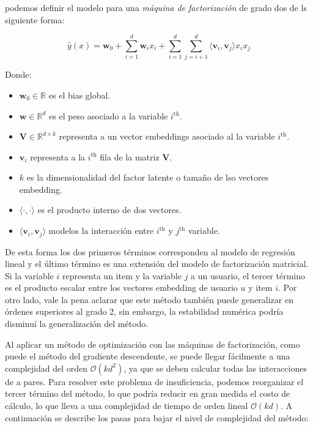 \documentclass[11pt,a4paper,twoside]{thesis}
\begin{document}
podemos definir el modelo para una \textit{máquina de factorización} de grado dos de ls siguiente forma:

\begin{equation*}
\hat{y}(x) = \mathbf{w}_0 + \sum_{i=1}^d \mathbf{w}_i x_i + \sum_{i=1}^d\sum_{j=i+1}^d \langle\mathbf{v}_i, \mathbf{v}_j\rangle x_i x_j
\end{equation*}
\begin{description}
	\item[Donde:]
\end{description}
\begin{itemize}
	\item $\mathbf{w}_0 \in \mathbb{R}$ es el bias global.
	\item $\mathbf{w} \in \mathbb{R}^d$ es el peso asociado a la variable $i^\mathrm{th}$.
	\item $\mathbf{V} \in \mathbb{R}^{d\times k}$ representa a un vector embeddings asociado al la variable $i^\mathrm{th}$.
	\item $\mathbf{v}_i$ representa a la $i^\mathrm{th}$ fila de la matriz $\mathbf{V}$. 
	\item $k$ es la dimensionalidad del factor latente o tamaño de lso vectores embedding.
	\item $\langle\cdot, \cdot \rangle$ es el producto interno de dos vectores.
	\item $\langle \mathbf{v}_i, \mathbf{v}_j \rangle$ modelos la interacción entre $i^\mathrm{th}$ y $j^\mathrm{th}$ variable. 
\end{itemize}

De esta forma los dos primeros términos corresponden al modelo de regresión lineal y el último término es una extensión del modelo de factorización matricial. Si la variable $i$ representa un item y la variable $j$ a un usuario, el tercer término es el producto escalar entre los vectores embedding de usuario $u$ y item $i$. Por otro lado, vale la pena aclarar que este método también puede generalizar en órdenes superiores al grado 2, sin embargo, la estabilidad numérica podría disminuí la generalización del método.


Al aplicar un método de optimización con las máquinas de factorización, como puede el método del gradiente descendente, se puede llegar fácilmente a una complejidad del orden $\mathcal{O}(kd^2)$, ya que se deben calcular todas las interacciones de a pares. Para resolver este problema de insuficiencia, podemos reorganizar el tercer término del método, lo que podría reducir en gran medida el costo de cálculo, lo que lleva a una complejidad de tiempo de orden lineal $\mathcal{O}(kd)$. A continuación se describe los pasas para bajar el nivel de complejidad del método:
\end{document}
